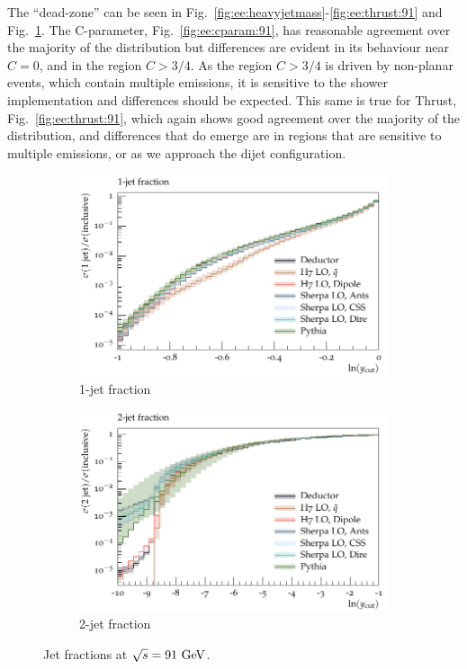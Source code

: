 The \Herwig \QTilde ``dead-zone'' can be seen in 
Fig.~\ref{fig:ee:heavyjetmass}-\ref{fig:ee:thrust:91} and
Fig.~\ref{fig:ee:r1:91}.  The C-parameter, Fig.~\ref{fig:ee:cparam:91}, has
reasonable agreement over the majority of the distribution but differences are
evident in its behaviour near $C=0$, and in the region $C>3/4$. As the region
$C>3/4$ is driven by non-planar events, which contain multiple emissions, it
is sensitive to the shower implementation and differences should be expected.
This same is true for Thrust, Fig.~\ref{fig:ee:thrust:91}, which again shows
good agreement over the majority of the distribution, and differences that do
emerge are in regions that are sensitive to multiple emissions, or as we
approach the dijet configuration.
\begin{figure}[h]
  \centering
  \begin{subfigure}[t]{0.49\textwidth}
    \includegraphics[width=1\textwidth]{plots/EE-91-MuShower/MC_EETOJETS/R1.pdf}
    \caption{1-jet fraction}
    \label{fig:ee:r1:91}
  \end{subfigure}
  \begin{subfigure}[t]{0.49\textwidth}
    \includegraphics[width=1\textwidth]{plots/EE-91-MuShower/MC_EETOJETS/R2.pdf}
    \caption{2-jet fraction}
    \label{fig:ee:r2:91}
  \end{subfigure}
  \caption{Jet fractions at $\sqrt{s}=91~\textrm{GeV}$.}
  \label{fig:ee:r:91}
\end{figure}
